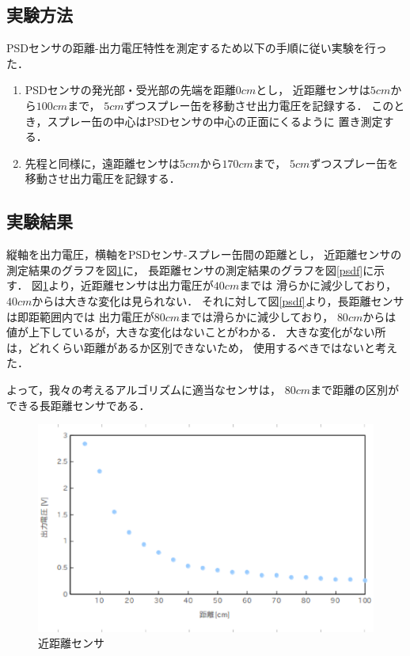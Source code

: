 \documentclass[10pt,a4j]{jarticle}
\begin{document}
\subsection{実験方法}
PSDセンサの距離-出力電圧特性を測定するため以下の手順に従い実験を行った．
\begin{enumerate}
 \item PSDセンサの発光部・受光部の先端を距離$0\unit{cm}$とし，
       近距離センサは$5\unit{cm}$から$100\unit{cm}$まで，
       $5\unit{cm}$ずつスプレー缶を移動させ出力電圧を記録する．
       このとき，スプレー缶の中心はPSDセンサの中心の正面にくるように
       置き測定する．
 \item 先程と同様に，遠距離センサは$5\unit{cm}$から$170\unit{cm}$まで，
       $5\unit{cm}$ずつスプレー缶を移動させ出力電圧を記録する．
\end{enumerate} 

\subsection{実験結果}
縦軸を出力電圧，横軸をPSDセンサ-スプレー缶間の距離とし，
近距離センサの測定結果のグラフを図\ref{psdn}に，
長距離センサの測定結果のグラフを図\ref{psdf}に示す．
図\ref{psdn}より，近距離センサは出力電圧が$40\unit{cm}$までは
滑らかに減少しており，$40\unit{cm}$からは大きな変化は見られない．
それに対して図\ref{psdf}より，長距離センサは即距範囲内では
出力電圧が$80\unit{cm}$までは滑らかに減少しており，
$80\unit{cm}$からは値が上下しているが，大きな変化はないことがわかる．
大きな変化がない所は，どれくらい距離があるか区別できないため，
使用するべきではないと考えた．

よって，我々の考えるアルゴリズムに適当なセンサは，
$80\unit{cm}$まで距離の区別ができる長距離センサである．


\newpage
\begin{figure}[h]
  \begin{center}
    \includegraphics[width=1.0\hsize]{picture/psdn.eps}
    \caption{近距離センサ}
    \label{psdn}
  \end{center}
\end{figure}
\end{document}
